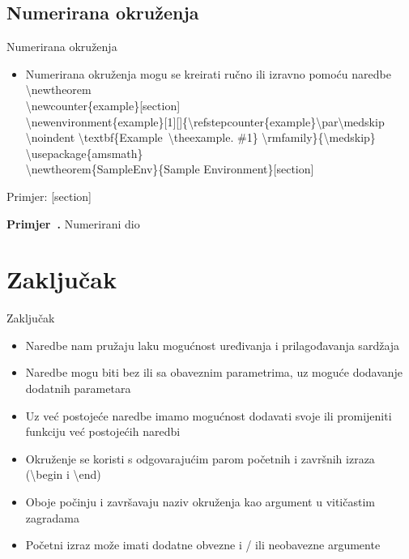 \documentclass{beamer}
\begin{document}
\subsection{Numerirana okruženja}

\begin{frame}{Numerirana okruženja}
\begin{itemize}
	\item Numerirana okruženja mogu se kreirati ručno ili izravno pomoću naredbe \textbackslash newtheorem\\

\textbackslash newcounter\{example\}[section]\\
\textbackslash newenvironment\{example\}[1][]\{\textbackslash refstepcounter\{example\}\textbackslash par\textbackslash medskip\\
   \textbackslash noindent \textbackslash textbf\{Example~\textbackslash theexample. \#1\} \textbackslash rmfamily\}\{\textbackslash medskip\}\\
 
 

\textbackslash usepackage\{amsmath\}\\
\textbackslash newtheorem\{SampleEnv\}\{Sample Environment\}[section]\\

\end{itemize}
\end{frame}

\begin{frame}{Primjer:}
[section]
\newenvironment{example1}[1][]{\refstepcounter{example1}\par\medskip
   \noindent \textbf{Primjer~\theexample. } \rmfamily}{\medskip}
   \begin{example1}
Numerirani dio
\end{example1}

\end{frame}
\section{Zaključak}
\begin{frame}[t]{Zaključak}
\begin{itemize}
	\item Naredbe nam pružaju laku mogućnost uređivanja i prilagođavanja sardžaja
	\item Naredbe mogu biti bez ili sa obaveznim parametrima, uz moguće dodavanje dodatnih parametara
	\item Uz već postojeće naredbe imamo mogućnost dodavati svoje ili promijeniti funkciju već postojećih naredbi
	\item Okruženje se koristi s odgovarajućim parom početnih i završnih izraza (\textbackslash begin i \textbackslash end)
	\item Oboje počinju i završavaju naziv okruženja kao argument u vitičastim zagradama
	\item Početni izraz može imati dodatne obvezne i / ili neobavezne argumente

\end{itemize}
\end{frame}




\end{document}
